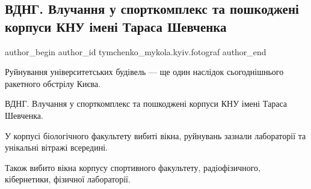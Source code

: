  
 
 
 
 
 
\subsection{ВДНГ. Влучання у спорткомплекс та пошкоджені корпуси КНУ імені Тараса Шевченка}
\label{sec:31_12_2022.fb.tymchenko_mykola.kyiv.fotograf.1.raketa_knu}
 
\ifcmt
 author_begin
   author_id tymchenko_mykola.kyiv.fotograf
 author_end
\fi


Руйнування університетських будівель — ще один наслідок сьогоднішнього
ракетного обстрілу Києва.

ВДНГ. Влучання у спорткомплекс та пошкоджені корпуси КНУ імені Тараса Шевченка.

У корпусі біологічного факультету вибиті вікна, руйнувань зазнали лабораторії
та унікальні вітражі всередині.

Також вибито вікна корпусу спортивного факультету, радіофізичного, кібернетики,
фізичної лабораторії.
